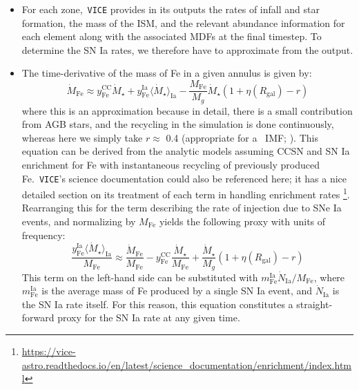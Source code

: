 \documentclass[fleqn, usenatbib]{mnras}
\begin{document}
\begin{itemize}
	\begin{itemize} 
		\item For each zone,~\texttt{VICE} provides in its outputs the rates 
		of infall and star formation, the mass of the ISM, and the relevant 
		abundance information for each element along with the associated 
		MDFs at the final timestep. To determine the SN Ia rates, we therefore 
		have to approximate from the output. 

		\item The time-derivative of the mass of Fe in a given annulus is 
		given by: 
		\begin{equation}
		\dot{M}_\text{Fe} \approx y_\text{Fe}^\text{CC}\dot{M}_\star + 
		y_\text{Fe}^\text{Ia}\langle\dot{M}_\star\rangle_\text{Ia} - 
		\frac{M_\text{Fe}}{M_g}\dot{M}_\star(1 + \eta(R_\text{gal}) - r) 
		\end{equation} 
		where this is an approximation because in detail, there is a small 
		contribution from AGB stars, and the recycling in the simulation is 
		done continuously, whereas here we simply take $r \approx$ 0.4 
		(appropriate for a~ IMF; 
		\citealp{Weinberg2017}). This equation can be derived from the 
		\citet{Weinberg2017} analytic models assuming CCSN and SN Ia 
		enrichment for Fe with instantaneous recycling of previously produced 
		Fe.~\texttt{VICE}'s science documentation could also be referenced 
		here; it has a nice detailed section on its treatment of each term in 
		handling enrichment rates \footnote{
			\url{https://vice-astro.readthedocs.io/en/latest/science_documentation/enrichment/index.html}
		}. 
		Rearranging this for the term describing the rate of injection due to 
		SNe Ia events, and normalizing by $M_\text{Fe}$ yields the following 
		proxy with units of frequency: 
		\begin{equation} 
		\frac{
			y_\text{Fe}^\text{Ia}\langle\dot{M}_\star\rangle_\text{Ia}
		}{
			M_\text{Fe} 
		} \approx 
		\frac{\dot{M}_\text{Fe}}{M_\text{Fe}} - y_\text{Fe}^\text{CC}\frac{
			\dot{M}_\star 
		}{
			M_\text{Fe} 
		} + \frac{\dot{M}_\star}{M_g}(1 + \eta(R_\text{gal}) - r) 
		\label{eq:ia_rate_proxy} 
		\end{equation} 
		This term on the left-hand side can be substituted with 
		$m_\text{Fe}^\text{Ia}\dot{N}_\text{Ia}/M_\text{Fe}$, where 
		$m_\text{Fe}^\text{Ia}$ is the average mass of Fe produced by a single 
		SN Ia event, and $\dot{N}_\text{Ia}$ is the SN Ia rate itself. For 
		this reason, this equation constitutes a straight-forward proxy for 
		the SN Ia rate at any given time. 


\end{itemize}
\end{itemize}
\end{document}
